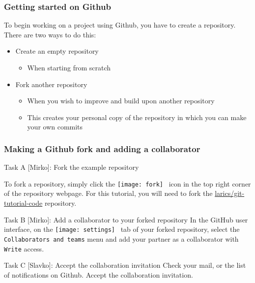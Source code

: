 \begin{frame}

\frametitle{Getting started on Github}

To begin working on a project using Github, you have to create a repository. There are two ways to do this:


\begin{itemize}
	\item Create an empty repository
	\begin{itemize}
	\item When starting from scratch
	\end{itemize}	
	
	\medskip
	\item Fork another repository
	\begin{itemize}
	\item When you wish to improve and build upon another repository
	\item This creates your personal copy of the repository in which you can make your own commits
	\end{itemize}
\end{itemize}

\end{frame}


\begin{frame}[fragile]

\frametitle{Making a Github fork and adding a collaborator}

\begin{block}{Task A [Mirko]: Fork the example repository}

	To fork a repository, simply click the \texttt{[image: fork]} \, icon in the top right corner of the repository webpage. For this tutorial, you will need to fork the \href{https://github.com/larics/git-tutorial-code.git}{larics/git-tutorial-code} repository.
\end{block}

\begin{block}{Task B [Mirko]: Add a collaborator to your forked repository}
In the GitHub user interface, on the \texttt{[image: settings]} \, tab of your forked repository, select the \texttt{Collaborators and teams} menu and add your partner as a collaborator with \texttt{Write} access.
\end{block}

\begin{block}{Task C [Slavko]: Accept the collaboration invitation}
Check your mail, or the list of notifications on Github. Accept the collaboration invitation.
\end{block}

\end{frame}

